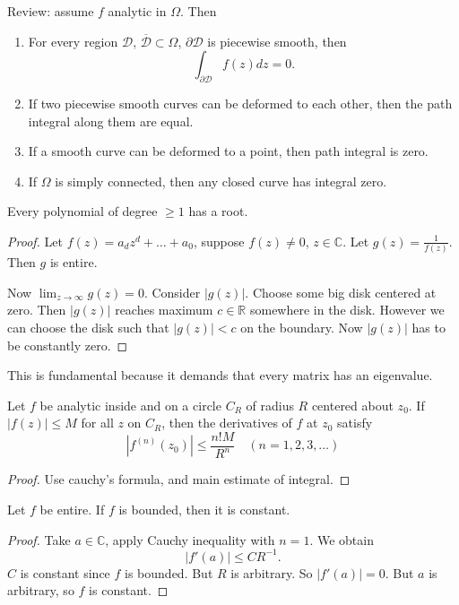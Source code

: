
Review: assume $f$ analytic in $\Omega$. Then
\begin{enumerate}
	\item For every region $\mathcal{D}$, $\overline{\mathcal{D}} \subset \Omega$, $\partial \mathcal{D}$ is piecewise smooth, then
		\[
			\int _{\partial \mathcal{D}} f(z) dz = 0
		.\] 
	\item If two piecewise smooth curves can be deformed to each other, then the path integral along them are equal.
	\item If a smooth curve can be deformed to a point, then path integral is zero.
	\item If $ \Omega$ is simply connected, then any closed curve has integral zero.
\end{enumerate}

\begin{theorem}
	Every polynomial of degree $\ge 1$ has a root.
\end{theorem}
\begin{proof}
	Let $f(z) = a_d z^d + \ldots + a_0$, suppose $f(z) \neq 0$, $z \in \mathbb{C}$. Let $g(z) = \frac{1}{f(z)}$. Then  $g$ is entire. 

	Now  $\lim_{z \to \infty} g(z) = 0$. Consider $|g(z)|$. Choose some big disk centered at zero. Then $|g(z)|$ reaches maximum $c \in \mathbb{R}$ somewhere in the disk. However we can choose the disk such that $|g(z)| < c $ on the boundary. Now $|g(z)|$ has to be constantly zero.
\end{proof}

\begin{remark}
	This is fundamental because it demands that every matrix has an eigenvalue.
\end{remark}


\begin{theorem}
	Let $f$ be analytic inside and on a circle $C_R$ of radius $R$ centered about $z_0$. If $|f(z)| \leq M$ for all $z$ on $C_R$, then the derivatives of $f$ at $z_0$ satisfy
\[
\left|f^{(n)}\left(z_0\right)\right| \leq \frac{n ! M}{R^n} \quad(n=1,2,3, \ldots)
\]
\end{theorem}
\begin{proof}
	Use cauchy's formula, and main estimate of integral.
\end{proof}

\begin{theorem}
	Let $f$ be entire. If $f$ is bounded, then it is constant.
\end{theorem}
\begin{proof}
	Take $a \in \mathbb{C}$, apply Cauchy inequality with $n=1$. We obtain \[
		|f'(a)| \le C R^{-1}
	.\] 
	$C$ is constant since $f$ is bounded. But $R$ is arbitrary. So $|f'(a)| = 0$. But  $a$ is arbitrary, so $f$ is constant.
\end{proof}

